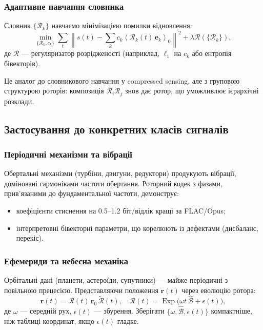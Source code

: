 \documentclass[11pt,a4paper]{article}
\newcommand{\grade}[2]{\left\langle #1 \right\rangle_{#2}}
\newcommand{\scal}[1]{\grade{#1}{0}}
\newcommand{\rev}[1]{\widetilde{#1}}           %
\newcommand{\Exp}{\operatorname{Exp}}
\newcommand{\Rotor}{\mathcal{R}}
\newcommand{\Biv}{\mathcal{B}}
\theoremstyle{definition}
\theoremstyle{plain}
\theoremstyle{remark}
\begin{document}
\subsubsection{Адаптивне навчання словника}

Словник $\{\Rotor_k\}$ навчаємо мінімізацією помилки відновлення:
\begin{equation}
\min_{\{\Rotor_k, c_k\}} \sum_t \left\|s(t) - \sum_k c_k \scal{\Rotor_k(t)\, \mathbf{e}_k}\right\|^2 + \lambda \mathcal{R}(\{\Rotor_k\}),
\end{equation}
де $\mathcal{R}$ — регуляризатор розрідженості (наприклад, $\ell_1$ на $c_k$ або ентропія бівекторів).

Це аналог до словникового навчання у compressed sensing, але з груповою структурою роторів: композиція $\Rotor_i \Rotor_j$ знов дає ротор, що уможливлює ієрархічні розклади.

\subsection{Застосування до конкретних класів сигналів}

\subsubsection{Періодичні механізми та вібрації}

Обертальні механізми (турбіни, двигуни, редуктори) продукують вібрації, доміновані гармоніками частоти обертання. Роторний кодек з фазами, прив’язаними до фундаментальної частоти, демонструє:
\begin{itemize}
  \item коефіцієнти стиснення на 0.5–1.2 біт/відлік кращі за FLAC/Opus;
  \item інтерпретовні бівекторні параметри, що корелюють із дефектами (дисбаланс, перекіс).
\end{itemize}

\subsubsection{Ефемериди та небесна механіка}

Орбітальні дані (планети, астероїди, супутники) — майже періодичні з повільною прецесією. Представляючи положення $\mathbf{r}(t)$ через еволюцію ротора:
\begin{equation}
\mathbf{r}(t) = \Rotor(t)\, \mathbf{r}_0\, \rev{\Rotor}(t), \quad \Rotor(t) = \Exp\!\big(\omega t\, \hat{\Biv} + \epsilon(t)\big),
\end{equation}
де $\omega$ — середній рух, $\epsilon(t)$ — збурення. Зберігати $\{\omega, \hat{\Biv}, \epsilon(t)\}$ компактніше, ніж таблиці координат, якщо $\epsilon(t)$ гладке.
\end{document}
